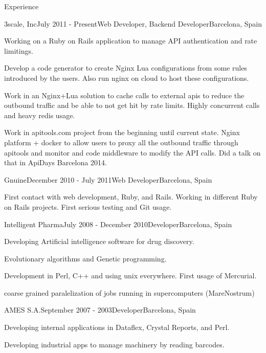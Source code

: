 \documentclass{resume} %
\begin{document}
\begin{rSection}{Experience}

\begin{rSubsection}{3scale, Inc}{July 2011 - Present}{Web Developer, Backend Developer}{Barcelona, Spain}
\item Working on a Ruby on Rails application to manage API authentication and rate limitings.
\item Develop a code generator to create Nginx Lua configurations from
  some rules introduced by the users. Also run nginx on cloud to host
  these configurations.
\item Work in an Nginx+Lua solution to cache calls to external apis to
  reduce the outbound traffic and be able to not get hit by rate
  limits. Highly concurrent calls and heavy redis usage.
\item Work in apitools.com project from the beginning until current
  state. Nginx platform + docker to allow users to proxy all the
  outbound traffic through apitools and monitor and code middleware to
  modify the API calls. Did a talk on that in ApiDays Barcelona 2014.
\end{rSubsection}


\begin{rSubsection}{Gnuine}{December 2010 - July 2011}{Web Developer}{Barcelona, Spain}
\item First contact with web development, Ruby, and Rails. Working in
  different Ruby on Rails projects. First serious testing and Git
  usage.
\end{rSubsection}


\begin{rSubsection}{Intelligent Pharma}{July 2008 - December 2010}{Developer}{Barcelona, Spain}
\item Developing Artificial intelligence software for drug discovery.
\item Evolutionary algorithms and Genetic programming.
\item Development in Perl, C++ and using unix everywhere. First usage of Mercurial.
\item coarse grained paralelization of jobs running in supercomputers (MareNostrum)
\end{rSubsection}


\begin{rSubsection}{AMES S.A.}{September 2007 - 2003}{Developer}{Barcelona, Spain}
\item Developing internal applications in Dataflex, Crystal Reports, and Perl.
\item Developing industrial apps to manage machinery by reading barcodes.
\end{rSubsection}

\end{rSection}
\end{document}
